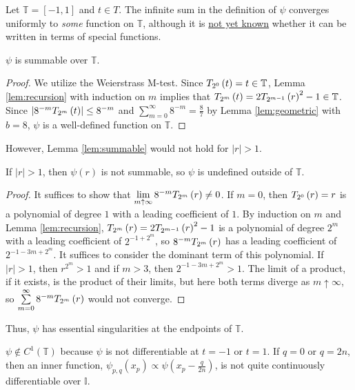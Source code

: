 Let $\mathbb{T} = \left[-1,1\right]$ and $t \in T$. The infinite sum in the definition of $\psi$ converges uniformly to \emph{some} function on $\mathbb{T}$, although it is \underline{not yet known} whether it can be written in terms of special functions. 

\begin{lemma}[]
  \label{lem:summable}
  \leanok
  $\psi$ is summable over $\mathbb{T}$.
\end{lemma}
  
\begin{proof}
  We utilize the Weierstrass M-test. Since $T_{2^{0}}\left(t\right) = t \in \mathbb{T}$, Lemma \ref{lem:recursion} with induction on $m$ implies that $T_{2^{m}}\left(t\right) = 2T_{2^{m - 1}}\left(r\right)^2 - 1 \in \mathbb{T}$. Since $\left|8^{-m} T_{2^{m}}\left(t\right)\right| \leq 8^{-m}$ and $\sum\limits_{m = 0}^\infty 8^{-m} = \frac{8}{7}$ by Lemma \ref{lem:geometric} with $b = 8$, $\psi$ is a well-defined function on $\mathbb{T}$.
\end{proof}
\noindent However, Lemma \ref{lem:summable} would not hold for $\left|r\right| > 1$.
\begin{lemma}[]
  \label{lem:not_summable}
If $\left|r\right| > 1$, then $\psi\left(r\right)$ is not summable, so $\psi$ is undefined outside of $\mathbb{T}$.
\end{lemma}

\begin{proof}
It suffices to show that $\lim\limits_{m \uparrow \infty} 8^{-m} T_{2^{m}}\left(r\right) \neq 0$. If $m = 0$, then $T_{2^{0}}\left(r\right) = r$ is a polynomial of degree $1$ with a leading coefficient of $1$. By induction on $m$ and Lemma \ref{lem:recursion}, $T_{2^{m}}\left(r\right) = 2 T_{2^{m - 1}}\left(r\right)^2 - 1$ is a polynomial of degree $2^m$ with a leading coefficient of $2^{-1 + 2^m}$, so $8^{-m} T_{2^{m}}\left(r\right)$ has a leading coefficient of $2^{-1 - 3m + 2^m}$. It suffices to consider the dominant term of this polynomial. If $\left|r\right| > 1$, then $r^{2^m} > 1$ and if $m > 3$, then $2^{-1 - 3m + 2^m} > 1$. The limit of a product, if it exists, is the product of their limits, but here both terms diverge as $m \uparrow \infty$, so $\sum\limits_{m = 0}^\infty 8^{-m}T_{2^{m}}\left(r\right)$ would not converge.
\end{proof}

Thus, $\psi$ has essential singularities at the endpoints of $\mathbb{T}$.
\begin{proposition}[]
  \label{prop:nondifferentiable}
  $\psi \notin C^1\left(\mathbb{T}\right)$ because $\psi$ is not differentiable at $t = -1$ or $t = 1$. If $q = 0$ or $q = 2n$, then an inner function, $\psi_{p,q}\left(x_p\right) \propto \psi\left(x_p - \frac{q}{2n}\right)$, is not quite continuously differentiable over $\mathbb{I}$. 
\end{proposition}
  

